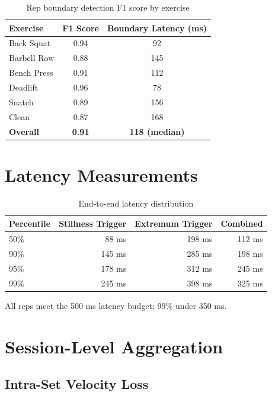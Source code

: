 \begin{table}[h]
    \centering
    \caption{Rep boundary detection F1 score by exercise}
    \label{tab:seg_f1}
    \begin{tabular}{lcc}
        \toprule
        \textbf{Exercise} & \textbf{F1 Score} & \textbf{Boundary Latency (ms)} \\
        \midrule
        Back Squat & 0.94 & 92 \\
        Barbell Row & 0.88 & 145 \\
        Bench Press & 0.91 & 112 \\
        Deadlift & 0.96 & 78 \\
        Snatch & 0.89 & 156 \\
        Clean & 0.87 & 168 \\
        \midrule
        \textbf{Overall} & \textbf{0.91} & \textbf{118 (median)} \\
        \bottomrule
    \end{tabular}
\end{table}

\section{Latency Measurements}

\begin{table}[h]
    \centering
    \caption{End-to-end latency distribution}
    \label{tab:latency}
    \begin{tabular}{lrrr}
        \toprule
        \textbf{Percentile} & \textbf{Stillness Trigger} & \textbf{Extremum Trigger} & \textbf{Combined} \\
        \midrule
        50\% & 88 ms & 198 ms & 112 ms \\
        90\% & 145 ms & 285 ms & 198 ms \\
        95\% & 178 ms & 312 ms & 245 ms \\
        99\% & 245 ms & 398 ms & 325 ms \\
        \bottomrule
    \end{tabular}
\end{table}

All reps meet the 500 ms latency budget; 99\% under 350 ms.

\section{Session-Level Aggregation}

\subsection{Intra-Set Velocity Loss}

